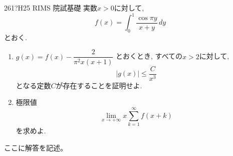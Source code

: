 \begin{thm}{261}{\hosi ?}{H25 RIMS 院試基礎}
実数$x>0$に対して, 
\[f(x) = \int_{0}^{1} \dfrac{\cos{\pi y}}{x+y} \, dy\]
とおく. 
\begin{enumerate}[label=(\roman*)]
\item $g(x) = f(x) - \dfrac{2}{\pi^2 x(x+1)}$ とおくとき, すべての$x>2$に対して, 
\[|g(x)| \leq \dfrac{C}{x^3}\]
となる定数$C$が存在することを証明せよ. 
\item 極限値
\[\lim_{x\to +\infty} x\sum_{k=1}^{\infty} f(x+k) \]
を求めよ. 
\end{enumerate}
\end{thm}

ここに解答を記述。